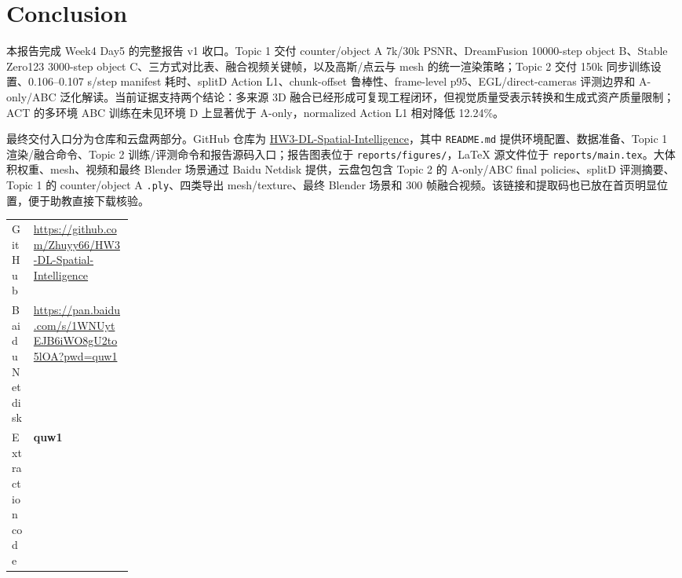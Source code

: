 \documentclass{article}
\begin{document}
	\section{Conclusion}

	本报告完成 Week4 Day5 的完整报告 v1 收口。Topic 1 交付 counter/object A 7k/30k PSNR、DreamFusion 10000-step object B、Stable Zero123 3000-step object C、三方式对比表、融合视频关键帧，以及高斯/点云与 mesh 的统一渲染策略；Topic 2 交付 150k 同步训练设置、0.106--0.107 s/step manifest 耗时、splitD Action L1、chunk-offset 鲁棒性、frame-level p95、EGL/direct-cameras 评测边界和 A-only/ABC 泛化解读。当前证据支持两个结论：多来源 3D 融合已经形成可复现工程闭环，但视觉质量受表示转换和生成式资产质量限制；ACT 的多环境 ABC 训练在未见环境 D 上显著优于 A-only，normalized Action L1 相对降低 12.24\%。

	最终交付入口分为仓库和云盘两部分。GitHub 仓库为 \href{https://github.com/Zhuyy66/HW3-DL-Spatial-Intelligence}{HW3-DL-Spatial-Intelligence}，其中 \texttt{README.md} 提供环境配置、数据准备、Topic 1 渲染/融合命令、Topic 2 训练/评测命令和报告源码入口；报告图表位于 \texttt{reports/figures/}，LaTeX 源文件位于 \texttt{reports/main.tex}。大体积权重、mesh、视频和最终 Blender 场景通过 Baidu Netdisk 提供，云盘包包含 Topic 2 的 A-only/ABC final policies、splitD 评测摘要、Topic 1 的 counter/object A \texttt{.ply}、四类导出 mesh/texture、最终 Blender 场景和 300 帧融合视频。该链接和提取码也已放在首页明显位置，便于助教直接下载核验。

	\begin{center}
		\small
		\begin{tabularx}{0.96\linewidth}{@{}p{0.18\linewidth}X@{}}
			\toprule
			GitHub & \href{https://github.com/Zhuyy66/HW3-DL-Spatial-Intelligence}{https://github.com/Zhuyy66/HW3-DL-Spatial-Intelligence} \\
			Baidu Netdisk & \href{https://pan.baidu.com/s/1WNUytEJB6iWO8gU2to5lOA?pwd=quw1}{https://pan.baidu.com/s/1WNUytEJB6iWO8gU2to5lOA?pwd=quw1} \\
			Extraction code & \textbf{quw1} \\
			\bottomrule
		\end{tabularx}
	\end{center}

	\nocite{*}
	\FloatBarrier
	
	

	
\end{document}
